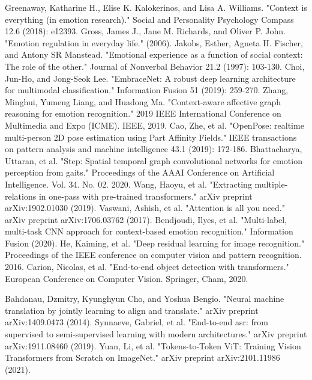 \documentclass[conference]{IEEEtran}
\begin{document}
\begin{thebibliography}{00}
  Greenaway, Katharine H., Elise K. Kalokerinos, and Lisa A. Williams. "Context is everything (in emotion research)." Social and Personality Psychology Compass 12.6 (2018): e12393.
 Gross, James J., Jane M. Richards, and Oliver P. John. "Emotion regulation in everyday life." (2006).
 Jakobs, Esther, Agneta H. Fischer, and Antony SR Manstead. "Emotional experience as a function of social context: The role of the other." Journal of Nonverbal Behavior 21.2 (1997): 103-130.
  Choi, Jun-Ho, and Jong-Seok Lee. "EmbraceNet: A robust deep learning architecture for multimodal classification." Information Fusion 51 (2019): 259-270.
  Zhang, Minghui, Yumeng Liang, and Huadong Ma. "Context-aware affective graph reasoning for emotion recognition." 2019 IEEE International Conference on Multimedia and Expo (ICME). IEEE, 2019.
  Cao, Zhe, et al. "OpenPose: realtime multi-person 2D pose estimation using Part Affinity Fields." IEEE transactions on pattern analysis and machine intelligence 43.1 (2019): 172-186.
 Bhattacharya, Uttaran, et al. "Step: Spatial temporal graph convolutional networks for emotion perception from gaits." Proceedings of the AAAI Conference on Artificial Intelligence. Vol. 34. No. 02. 2020.
  Wang, Haoyu, et al. "Extracting multiple-relations in one-pass with pre-trained transformers." arXiv preprint arXiv:1902.01030 (2019).
 Vaswani, Ashish, et al. "Attention is all you need." arXiv preprint arXiv:1706.03762 (2017).
 Bendjoudi, Ilyes, et al. "Multi-label, multi-task CNN approach for context-based emotion recognition." Information Fusion (2020).
 He, Kaiming, et al. "Deep residual learning for image recognition." Proceedings of the IEEE conference on computer vision and pattern recognition. 2016.
 Carion, Nicolas, et al. "End-to-end object detection with transformers." European Conference on Computer Vision. Springer, Cham, 2020.

 Bahdanau, Dzmitry, Kyunghyun Cho, and Yoshua Bengio. "Neural machine translation by jointly learning to align and translate." arXiv preprint arXiv:1409.0473 (2014).
 Synnaeve, Gabriel, et al. "End-to-end asr: from supervised to semi-supervised learning with modern architectures." arXiv preprint arXiv:1911.08460 (2019).
 Yuan, Li, et al. "Tokens-to-Token ViT: Training Vision Transformers from Scratch on ImageNet." arXiv preprint arXiv:2101.11986 (2021).
\end{thebibliography}
% 
\end{document}
